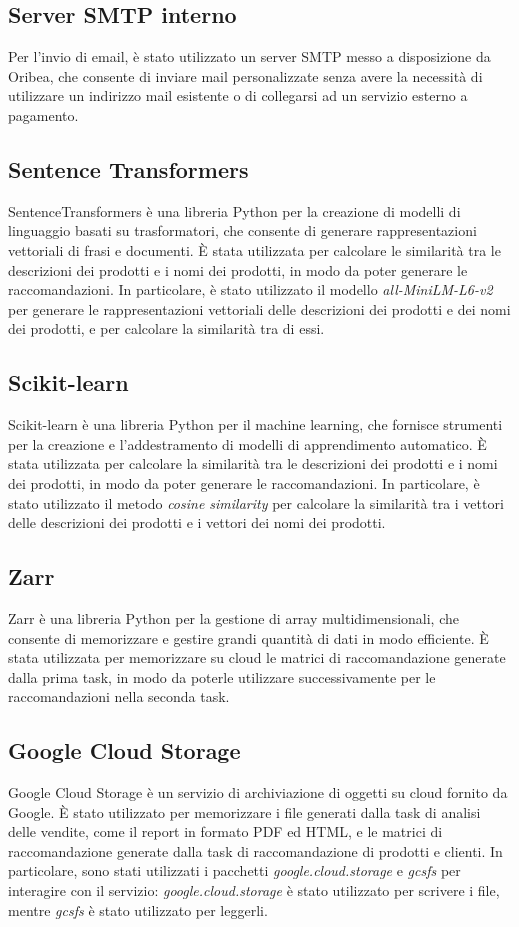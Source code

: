 \subsection{Server SMTP interno}
Per l'invio di email, è stato utilizzato un server SMTP messo a disposizione da Oribea, che consente di inviare mail personalizzate senza avere la necessità di utilizzare un indirizzo mail esistente o di collegarsi ad un servizio esterno a pagamento. 

\subsection{Sentence Transformers}
SentenceTransformers è una libreria Python per la creazione di modelli di linguaggio basati su trasformatori, che consente di generare rappresentazioni vettoriali di frasi e documenti. È stata utilizzata per calcolare le similarità tra le descrizioni dei prodotti e i nomi dei prodotti, in modo da poter generare le raccomandazioni. In particolare, è stato utilizzato il modello \emph{all-MiniLM-L6-v2} per generare le rappresentazioni vettoriali delle descrizioni dei prodotti e dei nomi dei prodotti, e per calcolare la similarità tra di essi.

\subsection{Scikit-learn}
Scikit-learn è una libreria Python per il machine learning, che fornisce strumenti per la creazione e l'addestramento di modelli di apprendimento automatico. È stata utilizzata per calcolare la similarità tra le descrizioni dei prodotti e i nomi dei prodotti, in modo da poter generare le raccomandazioni. In particolare, è stato utilizzato il metodo \emph{cosine similarity} per calcolare la similarità tra i vettori delle descrizioni dei prodotti e i vettori dei nomi dei prodotti.

\subsection{Zarr}
Zarr è una libreria Python per la gestione di array multidimensionali, che consente di memorizzare e gestire grandi quantità di dati in modo efficiente. È stata utilizzata per memorizzare su cloud le matrici di raccomandazione generate dalla prima task, in modo da poterle utilizzare successivamente per le raccomandazioni nella seconda task.

\subsection{Google Cloud Storage}
Google Cloud Storage è un servizio di archiviazione di oggetti su cloud fornito da Google. È stato utilizzato per memorizzare i file generati dalla task di analisi delle vendite, come il report in formato PDF ed HTML, e le matrici di raccomandazione generate dalla task di raccomandazione di prodotti e clienti. In particolare, sono stati utilizzati i pacchetti \emph{google.cloud.storage} e \emph{gcsfs} per interagire con il servizio: \emph{google.cloud.storage} è stato utilizzato per scrivere i file, mentre \emph{gcsfs} è stato utilizzato per leggerli.

